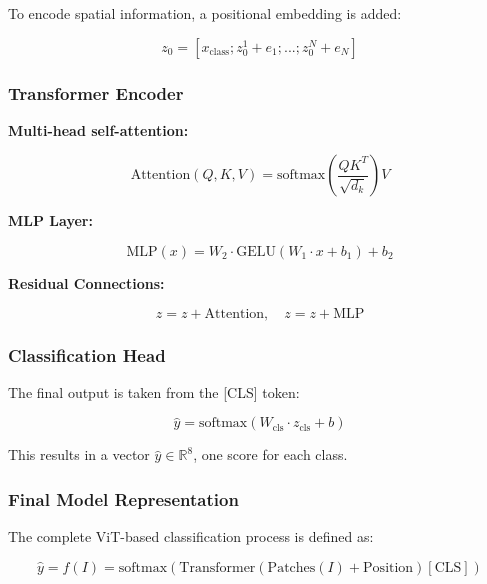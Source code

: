 \documentclass[preprint,12pt]{elsarticle}
\begin{document}
To encode spatial information, a positional embedding is added:

\begin{equation}
z_0 = [x_{\text{class}}; z_0^1 + e_1; ...; z_0^N + e_N]
\label{eq:positional-embedding}
\end{equation}

\subsubsection{Transformer Encoder}

\textbf{Multi-head self-attention:}

\begin{equation}
\text{Attention}(Q, K, V) = \text{softmax}\left( \frac{QK^T}{\sqrt{d_k}} \right)V
\label{eq:attention}
\end{equation}

\textbf{MLP Layer:}

\begin{equation}
\text{MLP}(x) = W_2 \cdot \text{GELU}(W_1 \cdot x + b_1) + b_2
\label{eq:mlp}
\end{equation}

\textbf{Residual Connections:}

\begin{equation}
z = z + \text{Attention}, \quad z = z + \text{MLP}
\label{eq:residual}
\end{equation}

\subsubsection{Classification Head}

The final output is taken from the [CLS] token:

\begin{equation}
\hat{y} = \text{softmax}(W_{\text{cls}} \cdot z_{\text{cls}} + b)
\label{eq:classification}
\end{equation}

This results in a vector \( \hat{y} \in \mathbb{R}^8 \), one score for each class.

\subsubsection{Final Model Representation}

The complete ViT-based classification process is defined as:

\begin{equation}
\hat{y} = f(I) = \text{softmax}(\text{Transformer}(\text{Patches}(I) + \text{Position})[\text{CLS}])
\label{eq:vit-final}
\end{equation}
\end{document}
